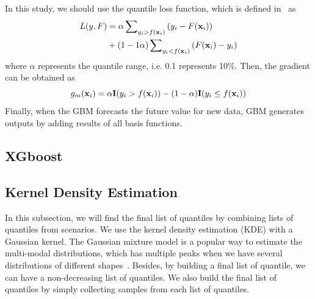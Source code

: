 \documentclass[journal]{IEEEtran} %
\begin{document}
In this study, we should use the quantile loss function, which is defined in~\cite{Ridgeway} as
\begin{equation}
\begin{aligned}
\label{QuantileLossFunction}
L(y,F)&  = \alpha \sum\nolimits_{{y_i} > f({{\bf{x}}_i})} {({y_i} - F({{\bf{x}}_i}))}  \\ &  + (1 - 1\alpha )\sum\nolimits_{{y_i} < f({{\bf{x}}_i})} {(F({{\bf{x}}_i}) - {y_i})}
\end{aligned}
\end{equation}
where $\alpha$ represents the quantile range, i.e. 0.1 represents 10\%. Then, the gradient can be obtained as
\begin{equation}
\label{QuantileGradient}
{g_m}({{\bf{x}}_i}) = \alpha {\bf{I}}({y_i} > f({{\bf{x}}_i})) - (1 - \alpha ){\bf{I}}({y_i} \le f({{\bf{x}}_i}))
\end{equation}
Finally, when the GBM forecasts the future value for new data, GBM generates outputs by adding results of all basis functions.
















\subsection{XGboost}

















\newpage
\subsection{Kernel Density Estimation}
In this subsection, we will find the final list of quantiles by combining lists of quantiles from scenarios. We use the kernel density estimation (KDE) with a Gaussian kernel. The Gaussian mixture model is a popular way to estimate the multi-modal distributions, which has multiple peaks when we have several distributions of different shapes~\cite{Haben}. Besides, by building a final list of quantile, we can have a non-decreasing list of quantiles. We also build the final list of quantiles by simply collecting samples from each list of quantiles. 
\end{document}
